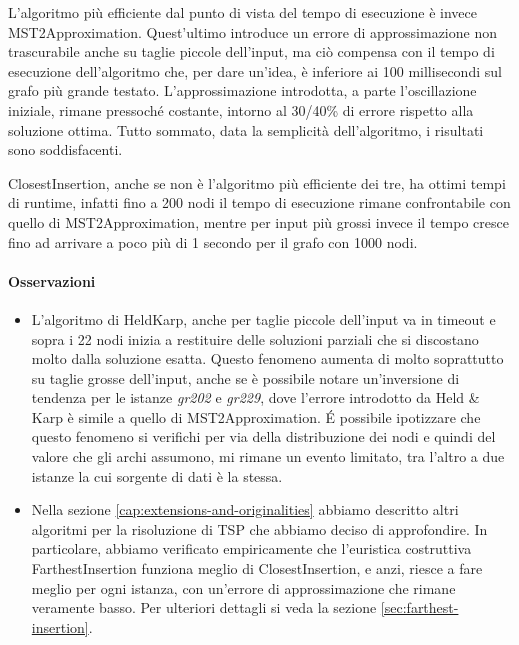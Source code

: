 \noindent L'algoritmo più efficiente dal punto di vista del tempo di
esecuzione è invece MST2Approximation.  Quest'ultimo introduce un
errore di approssimazione non trascurabile anche su taglie piccole
dell'input, ma ciò compensa con il tempo di esecuzione dell'algoritmo
che, per dare un'idea, è inferiore ai 100 millisecondi sul grafo più
grande testato. L'approssimazione introdotta, a parte l'oscillazione
iniziale, rimane pressoché costante, intorno al 30/40\% di errore
rispetto alla soluzione ottima. Tutto sommato, data la semplicità
dell'algoritmo, i risultati sono soddisfacenti.

\noindent ClosestInsertion, anche se non è l'algoritmo più efficiente
dei tre, ha ottimi tempi di runtime, infatti fino a 200 nodi il tempo
di esecuzione rimane confrontabile con quello di MST2Approximation,
mentre per input più grossi invece il tempo cresce fino ad arrivare a
poco più di 1 secondo per il grafo con 1000 nodi.

\paragraph{Osservazioni}

\begin{itemize}
    \item L'algoritmo di HeldKarp, anche per taglie piccole dell'input
      va in timeout e sopra i 22 nodi inizia a restituire delle
      soluzioni parziali che si discostano molto dalla soluzione
      esatta. Questo fenomeno aumenta di molto soprattutto su taglie
      grosse dell'input, anche se è possibile notare un'inversione di
      tendenza per le istanze \emph{gr202} e \emph{gr229}, dove
      l'errore introdotto da Held \& Karp è simile a quello di
      MST2Approximation. \'E possibile ipotizzare che questo fenomeno
      si verifichi per via della distribuzione dei nodi e quindi del
      valore che gli archi assumono, mi rimane un evento limitato, tra
      l'altro a due istanze la cui sorgente di dati è la stessa. \\

    \item Nella sezione \ref{cap:extensions-and-originalities} abbiamo
      descritto altri algoritmi per la risoluzione di TSP che abbiamo
      deciso di approfondire. In particolare, abbiamo verificato
      empiricamente che l'euristica costruttiva FarthestInsertion
      funziona meglio di ClosestInsertion, e anzi, riesce a fare
      meglio per ogni istanza, con un'errore di approssimazione che
      rimane veramente basso. Per ulteriori dettagli si veda la
      sezione \ref{sec:farthest-insertion}. \\
\end{itemize}
